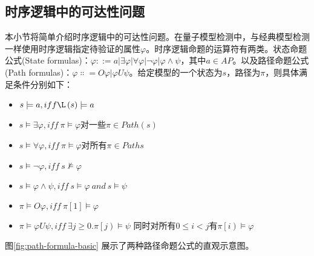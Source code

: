 \subsection{时序逻辑中的可达性问题}
本小节将简单介绍时序逻辑中的可达性问题。在量子模型检测中，与经典模型检测一样使用时序逻辑指定待验证的属性\(\varphi\)。时序逻辑命题的运算符有两类\citep{goranko_2023}。状态命题公式(State formulas)：\(\varphi ::=a\left|\exists\varphi\right|\forall \varphi\left|\lnot\varphi\right|\varphi\land\psi\)，其中\(a\in AP\)。以及路径命题公式(Path formulas)：\(\varphi\Colon=O\varphi|\varphi U\psi\)。给定模型的一个状态为\(s\)，路径为\(\pi\)，则具体满足条件分别如下：
\begin{itemize}
    \item \(s\models a,iff \L\left(s\right)\models a\)
    \item \(s\models\exists\varphi,iff\ \pi\models\varphi\)对一些\(\pi\in Path\left(s\right)\)
    \item \(s\models\forall\varphi,iff\ \pi\models\varphi\)对所有\(π\in Paths\)
    \item \(s\models\lnot\varphi,iff\ s\nvDash\varphi\)
    \item \(s\models\varphi\land\psi,iff\ s\models\varphi\ and\ s\models\psi\)
    \item \(\pi\models O\varphi,iff\ \pi\left[1\right]\models\varphi\)
    \item \(\pi\models\varphi U\psi,iff\ \exists j\geq0\).\(\pi\left[j\right)\models\psi\) 同时对所有\(0\le i<j\)有\(\pi\left[i\right)\models\varphi\)
\end{itemize}


图\ref{fig:path-formula-basic} 展示了两种路径命题公式的直观示意图。


